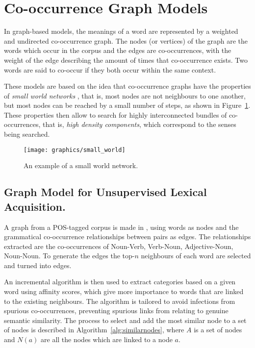 \section{Co-occurrence Graph Models}

In graph-based models, the meanings of a word are represented by a weighted
and undirected co-occurrence graph. The nodes (or vertices) of the graph are the
words which occur in the corpus and the edges are co-occurrences, with the
weight of the edge describing the amount of times that co-occurrence exists. Two
words are said to co-occur if they both occur within the same context.

These models are based on the idea that co-occurrence graphs have the properties
of \textit{small world networks} \cite{veronis2004hyperlex}, that is, most nodes
are not neighbours to one another, but most nodes can be reached by a small
number of steps, as shown in Figure~\ref{fig:small-world}. These properties
then allow to search for highly interconnected bundles of co-occurrences, that
is, \textit{high density components}, which correspond to the senses being
searched.

\begin{figure}
 \centering
 \texttt{[image: graphics/small\_world]}
 \caption{An example of a small world network.}
 \label{fig:small-world}
\end{figure}

\subsection{Graph Model for Unsupervised Lexical Acquisition.}

A graph from a \ac{POS}-tagged corpus is made in \cite{widdows2002graph}, using
words as nodes and the grammatical co-occurrence relationships between pairs as
edges. The relationships extracted are the co-occurrences of Noun-Verb,
Verb-Noun, Adjective-Noun, Noun-Noun. To generate the edges the top-$n$
neighbours of each word are selected and turned into edges.

An incremental algorithm is then used to extract categories based on a given
word using affinity scores, which give more importance to words that are linked
to the existing neighbours. The algorithm is tailored to avoid infections from
spurious co-occurrences, preventing spurious links from relating to genuine
semantic similarity. The process to select and add the most similar node to a
set of nodes is described in Algorithm~\ref{alg:similarnodes}, where $A$ is a
set of nodes and $N(a)$ are all the nodes which are linked to a node $a$.


